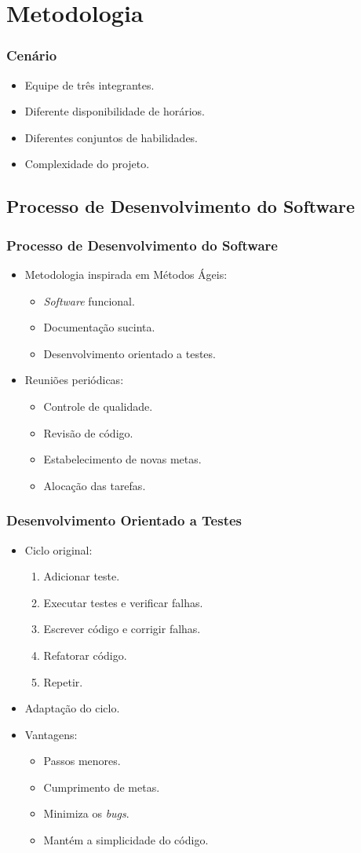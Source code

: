 \section{Metodologia}

\frame
{
\frametitle{Cenário}
\begin{itemize}
	\item Equipe de três integrantes.
	\item Diferente disponibilidade de horários.
	\item Diferentes conjuntos de habilidades.
	\item Complexidade do projeto.
\end{itemize}
}

\subsection{Processo de Desenvolvimento do Software}
\frame
{
\frametitle{Processo de Desenvolvimento do Software}
\begin{itemize}
	\item Metodologia inspirada em Métodos Ágeis:
	\begin{itemize}
		\item \emph{Software} funcional.
		\item Documentação sucinta.
		\item Desenvolvimento orientado a testes.
	\end{itemize}
	\item Reuniões periódicas:
	\begin{itemize}
		\item Controle de qualidade.
		\item Revisão de código.
		\item Estabelecimento de novas metas.
		\item Alocação das tarefas.
	\end{itemize}
\end{itemize}
}
\frame
{
\frametitle{Desenvolvimento Orientado a Testes}
\begin{itemize}
	\item Ciclo original:
	\begin{enumerate}
		\item Adicionar teste.
		\item Executar testes e verificar falhas.
		\item Escrever código e corrigir falhas.
		\item Refatorar código.
		\item Repetir.
	\end{enumerate}
	\item Adaptação do ciclo.
	\item Vantagens:
	\begin{itemize}
		\item Passos menores.
		\item Cumprimento de metas.
		\item Minimiza os \emph{bugs}.
		\item Mantém a simplicidade do código.
	\end{itemize}
\end{itemize}
}
